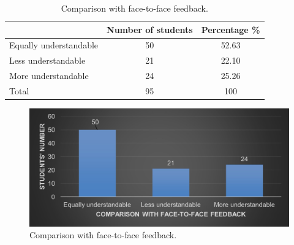 \documentclass[english]{textolivre}
\begin{document}
\begin{table}[h!]
\centering
\begin{threeparttable}
\caption{Comparison with face-to-face feedback.}
\label{tbl5}
\centering
\begin{tabular}{p{} c c}
\toprule
 & Number of students & Percentage \% \\ \midrule
Equally understandable & 50 & 52.63 \\
Less understandable & 21 & 22.10 \\
More understandable & 24 & 25.26 \\
Total & 95 & 100 \\
\bottomrule
\end{tabular}
\end{threeparttable}
\end{table}

\begin{figure}[h!]
 \centering
 \begin{minipage}{.85\textwidth}
 \includegraphics[width=\textwidth]{05.jpg}
 \caption{Comparison with face-to-face feedback.}
 \label{fig05}
 \end{minipage}
\end{figure}
\end{document}

